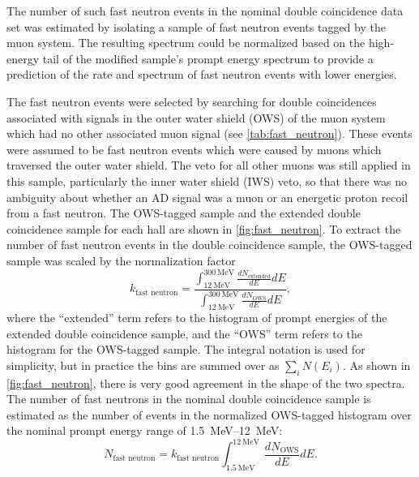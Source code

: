The number of such fast neutron events in the nominal double coincidence data set
was estimated by isolating a sample of fast neutron events
tagged by the muon system.
The resulting spectrum could be normalized based on the high-energy tail
of the modified sample's prompt energy spectrum
to provide a prediction of the rate and spectrum of fast neutron events
with lower energies.

The fast neutron events were selected by searching for
double coincidences associated with signals
in the outer water shield (OWS) of the muon system
which had no other associated muon signal
(see \cref{tab:fast_neutron}).
These events were assumed to be fast neutron events
which were caused by muons which traversed the outer water shield.
The veto for all other muons was still applied in this sample,
particularly the inner water shield (IWS) veto,
so that there was no ambiguity about whether an AD signal
was a muon or an energetic proton recoil from a fast neutron.
The OWS-tagged sample and the extended double coincidence sample for each hall
are shown in \cref{fig:fast_neutron}.
To extract the number of fast neutron events in the double coincidence sample,
the OWS-tagged sample was scaled by the normalization factor
\begin{equation}\label{eq:fast_neutron_integral}
    k_\text{fast neutron} = \frac{
        \int_{\SI{12}{\MeV}}^{\SI{300}{\MeV}} \frac{dN_{\text{extended}}}{dE} dE
    }{
        \int_{\SI{12}{\MeV}}^{\SI{300}{\MeV}} \frac{dN_{\text{OWS}}}{dE} dE
    },
\end{equation}
where the ``extended'' term refers to the histogram of prompt energies
of the extended double coincidence sample,
and the ``OWS'' term refers to the histogram for the OWS-tagged sample.
The integral notation is used for simplicity,
but in practice the bins are summed over as $\sum_i N(E_i)$.
As shown in \cref{fig:fast_neutron},
there is very good agreement in the shape of the two spectra.
The number of fast neutrons in the nominal double coincidence sample
is estimated as the number of events in the normalized OWS-tagged histogram
over the nominal prompt energy range of \SIrange{1.5}{12}{\MeV}:
\begin{equation}\label{eq:fast_neutron_count}
    N_\text{fast neutron} = k_\text{fast neutron}
    \int_{\SI{1.5}{\MeV}}^{\SI{12}{\MeV}} \frac{dN_{\text{OWS}}}{dE} dE.
\end{equation}

